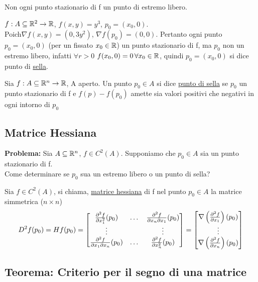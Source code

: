 \begin{osservazione}
  Non ogni punto stazionario di f \ace un punto di estremo libero.
\end{osservazione}
\begin{example}
  $f: A \subseteq \mathbb{R}^2 \to \mathbb{R}$, $f(x,y) = y^3$, $p_0 = (x_0,0)$. \\
  Poich\ace $\nabla f(x,y) = (0,3y^2)$, $\nabla f(p_0) = (0,0)$. Pertanto ogni punto $p_0 = (x_0,0)$ (per un fissato 
  $x_0\in \mathbb{R}$) \ace un punto stazionario di f, ma $p_0$ non \ace un estremo libero, infatti $\forall r > 0$ $f(x_0,0) = 0 \, 
  \forall x_0 \in \mathbb{R}$, quindi $p_0=(x_0,0)$ si dice punto di \underline{sella}.
\end{example}
\begin{definition}
  Sia $f: A \subseteq \mathbb{R}^n \to \mathbb{R}$, A aperto. Un punto $p_0 \in A$ si dice \underline{punto di sella} se $p_0$ \ace un punto 
  stazionario di f e $f(p)-f(p_0)$ amette sia valori positivi che negativi in ogni intorno di $p_0$
\end{definition}
\subsection{Matrice Hessiana}

\textbf{Problema:} Sia $A \subseteq \mathbb{R}^n$, $f \in C^2(A)$. Supponiamo che $p_0 \in A$ sia un punto stazionario di f. \\
Come determinare se $p_0$ sua un estremo libero o un  punto di sella?
\begin{definition} 
  Sia $f \in C^2(A)$, si chiama, \underline{matrice hessiana} di f nel punto $p_0\in A$ la matrice simmetrica ($n\times n$)
  $$D^2f(p_0) = H f(p_0) = \begin{bmatrix}
    \frac{\partial^2 f}{\partial x_1^2}(p_0) & \dots & \frac{\partial^2 f}{\partial x_n \partial x_1}(p_0) \\
    \vdots & & \vdots \\
    \frac{\partial^2 f}{\partial x_1 \partial x_n}(p_0) & \dots & \frac{\partial^2 f}{\partial x_n^2}(p_0) \\
  \end{bmatrix} = \begin{bmatrix}
    \nabla \left(\frac{\partial^2 f}{\partial x_1}\right)(p_0) \\
    \vdots \\
    \nabla \left(\frac{\partial^2 f}{\partial x_n}\right)(p_0)
  \end{bmatrix}$$
\end{definition}
\subsection{Teorema: Criterio per il segno di una matrice}
